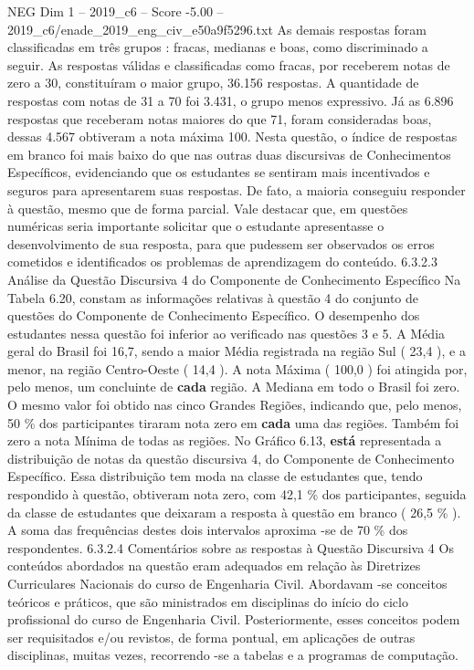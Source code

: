 \begin{textsample}{NEG Dim 1 – 2019\_c6 – Score -5.00 – 2019\_c6/enade\_2019\_eng\_civ\_e50a9f5296.txt}
As demais respostas foram classificadas em três grupos : fracas, medianas e boas, como discriminado a seguir.
As respostas válidas e classificadas como fracas, por receberem notas de zero a 30, constituíram o maior grupo, 36.156 respostas.
A quantidade de respostas com notas de 31 a 70 foi 3.431, o grupo menos expressivo.
Já as 6.896 respostas que receberam notas maiores do que 71, foram consideradas boas, dessas 4.567 obtiveram a nota máxima 100.
Nesta questão, o índice de respostas em branco foi mais baixo do que nas outras duas discursivas de Conhecimentos Específicos, evidenciando que os estudantes se sentiram mais incentivados e seguros para apresentarem suas respostas.
De fato, a maioria conseguiu responder à questão, mesmo que de forma parcial.
Vale destacar que, em questões numéricas seria importante solicitar que o estudante apresentasse o desenvolvimento de sua resposta, para que pudessem ser observados os erros cometidos e identificados os problemas de aprendizagem do conteúdo. 6.3.2.3 Análise da Questão Discursiva 4 do Componente de Conhecimento Específico Na Tabela 6.20, constam as informações relativas à questão 4 do conjunto de questões do Componente de Conhecimento Específico.
O desempenho dos estudantes nessa questão foi inferior ao verificado nas questões 3 e 5.
A Média geral do Brasil foi 16,7, sendo a maior Média registrada na região Sul ( 23,4 ), e a menor, na região Centro-Oeste ( 14,4 ).
A nota Máxima ( 100,0 ) foi atingida por, pelo menos, um concluinte de \textbf{cada} região.
A Mediana em todo o Brasil foi zero.
O mesmo valor foi obtido nas cinco Grandes Regiões, indicando que, pelo menos, 50 \% dos participantes tiraram nota zero em \textbf{cada} uma das regiões.
Também foi zero a nota Mínima de todas as regiões.
No Gráfico 6.13, \textbf{está} representada a distribuição de notas da questão discursiva 4, do Componente de Conhecimento Específico.
Essa distribuição tem moda na classe de estudantes que, tendo respondido à questão, obtiveram nota zero, com 42,1 \% dos participantes, seguida da classe de estudantes que deixaram a resposta à questão em branco ( 26,5 \% ).
A soma das frequências destes dois intervalos aproxima -se de 70 \% dos respondentes. 6.3.2.4 Comentários sobre as respostas à Questão Discursiva 4 Os conteúdos abordados na questão eram adequados em relação às Diretrizes Curriculares Nacionais do curso de Engenharia Civil.
Abordavam -se conceitos teóricos e práticos, que são ministrados em disciplinas do início do ciclo profissional do curso de Engenharia Civil.
Posteriormente, esses conceitos podem ser requisitados e/ou revistos, de forma pontual, em aplicações de outras disciplinas, muitas vezes, recorrendo -se a tabelas e a programas de computação.

\end{textsample}
